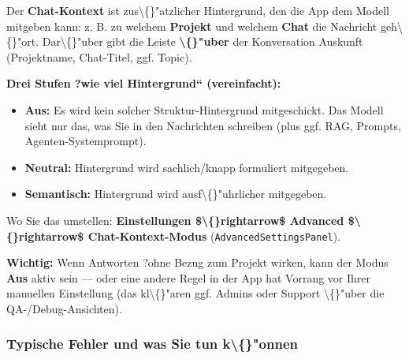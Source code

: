 Der \textbf{Chat-Kontext} ist zus\textbackslash\{\}"atzlicher Hintergrund, den die App dem Modell mitgeben kann: z. B. zu welchem \textbf{Projekt} und welchem \textbf{Chat} die Nachricht geh\textbackslash\{\}"ort. Dar\textbackslash\{\}"uber gibt die Leiste \textbf{\textbackslash\{\}"uber} der Konversation Auskunft (Projektname, Chat-Titel, ggf. Topic).

\textbf{Drei Stufen ?wie viel Hintergrund`` (vereinfacht):}

\begin{itemize}
\item \textbf{Aus:} Es wird kein solcher Struktur-Hintergrund mitgeschickt. Das Modell sieht nur das, was Sie in den Nachrichten schreiben (plus ggf. RAG, Prompts, Agenten-Systemprompt).
\item \textbf{Neutral:} Hintergrund wird sachlich/knapp formuliert mitgegeben.
\item \textbf{Semantisch:} Hintergrund wird ausf\textbackslash\{\}"uhrlicher mitgegeben.
\end{itemize}

Wo Sie das umstellen: \textbf{Einstellungen \$\textbackslash\{\}rightarrow\$ Advanced \$\textbackslash\{\}rightarrow\$ Chat-Kontext-Modus} (\texttt{AdvancedSettingsPanel}).

\textbf{Wichtig:} Wenn Antworten ?ohne Bezug zum Projekt\texttt{} wirken, kann der Modus \textbf{Aus} aktiv sein --- oder eine andere Regel in der App hat Vorrang vor Ihrer manuellen Einstellung (das kl\textbackslash\{\}"aren ggf. Admins oder Support \textbackslash\{\}"uber die QA-/Debug-Ansichten).

\subsubsection{Typische Fehler und was Sie tun k\textbackslash\{\}"onnen}


